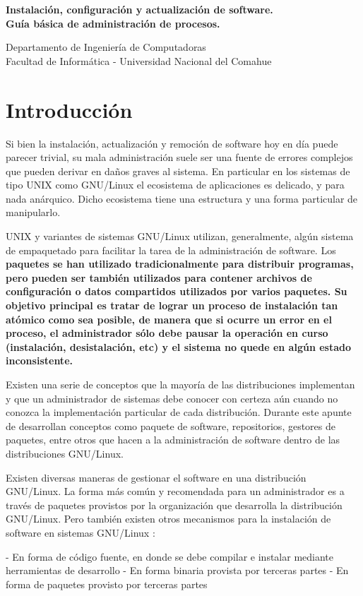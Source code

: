 \documentclass[12pt]{article}
\def\maketitle{

 \makeatletter
 {\color{bl} \centering \huge \sc \textbf{
  Instalación, configuración y actualización de software.\\ 
\large \vspace*{-8pt} \color{black} Guía básica de administración de procesos. 
 \vspace*{8pt} }\par}
 \makeatother

\makeatletter
 {\centering \small 
 	Departamento de Ingeniería de Computadoras \\
 	Facultad de Informática - Universidad Nacional del Comahue \\
 	\vspace{20pt} }
 \makeatother

}
\begin{document}
\thispagestyle{empty}
\maketitle
\setlength{\parindent}{0pt}

\section*{Introducción}

Si bien la instalación, actualización y remoción de software hoy en día
puede parecer trivial, su mala administración suele ser una fuente de 
errores complejos que pueden derivar en daños graves al sistema. 
En particular en los sistemas de tipo UNIX como GNU/Linux el ecosistema
de aplicaciones es delicado, y para nada anárquico. Dicho ecosistema tiene 
una estructura y una forma particular de manipularlo. 

UNIX y variantes de sistemas GNU/Linux utilizan, generalmente, algún
sistema de empaquetado para facilitar la tarea de la administración de software.
Los \bf{paquetes} se han utilizado tradicionalmente para distribuir programas,
pero pueden ser también utilizados para contener archivos de configuración
o datos compartidos utilizados por varios paquetes. Su objetivo principal
es tratar de lograr un proceso de instalación tan atómico como sea posible,
de manera que si ocurre un error en el proceso, el administrador
sólo debe pausar la operación en curso (instalación, desistalación, etc)
y el sistema no quede en algún estado inconsistente.

Existen una serie de conceptos que la 
mayoría de las distribuciones implementan y que un administrador de 
sistemas debe conocer con certeza aún cuando no conozca la implementación
particular de cada distribución.  Durante este apunte de desarrollan
 conceptos como paquete de software, 
repositorios, gestores de paquetes, entre otros que hacen a la 
administración de software dentro de las distribuciones GNU/Linux.

Existen diversas maneras de gestionar el software en una distribución 
GNU/Linux. La forma más común y recomendada para un administrador es a través de paquetes
provistos por la organización que desarrolla la distribución GNU/Linux.
Pero también existen otros mecanismos
para la instalación de software en sistemas GNU/Linux :

- En forma de código fuente, en donde se debe compilar e instalar mediante herramientas de desarrollo
- En forma binaria provista por terceras partes
- En forma de paquetes provisto por terceras partes
\end{document}
